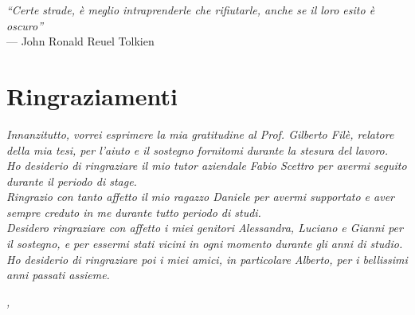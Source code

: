 
\cleardoublepage
{}
{}

\begin{flushright}{
	\slshape    
	``Certe strade, è meglio intraprenderle che rifiutarle, anche se il loro esito è oscuro''} \\ 
	\medskip
    --- John Ronald Reuel Tolkien
\end{flushright}


\bigskip

\begingroup
\let\clearpage\relax
\let\cleardoublepage\relax
\let\cleardoublepage\relax

\chapter*{Ringraziamenti}

\noindent \textit{Innanzitutto, vorrei esprimere la mia gratitudine al Prof. Gilberto Filè, relatore della mia tesi, per l'aiuto e il sostegno fornitomi durante la stesura del lavoro.}\\

\noindent \textit{Ho desiderio di ringraziare il mio tutor aziendale Fabio Scettro per avermi seguito durante il periodo di stage.}\\

\noindent \textit{Ringrazio con tanto affetto il mio ragazzo Daniele per avermi supportato e aver sempre creduto in me durante tutto periodo di studi.}\\

\noindent \textit{Desidero ringraziare con affetto i miei genitori Alessandra, Luciano e Gianni per il sostegno, e per essermi stati vicini in ogni momento durante gli anni di studio.}\\

\noindent \textit{Ho desiderio di ringraziare poi i miei amici, in particolare Alberto, per i bellissimi anni passati assieme.}\\
\bigskip

\noindent\textit{\myLocation, \myTime}
\hfill \myName

\endgroup

